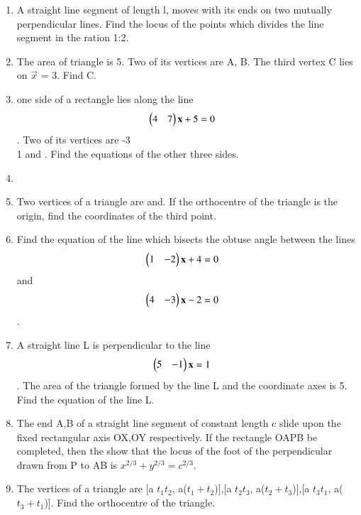 \begin{enumerate}
    \item  A straight line segment of length l, moves with its ends on two mutually perpendicular lines. Find the locus of the points which divides the line segment in the ration 1:2.
    \item The area of triangle is 5. Two of its vertices are A, B. The third vertex C lies on $\vec {x}$ = 3. Find C.
    \item one side of a rectangle lies along the line \begin{align}\begin{pmatrix}4 & 7\end{pmatrix} \mathbf {x} + 5 &= 0\end{align}. Two of its vertices are \myvec-{3\\1} and . Find the equations of the other three sides.
   \item \item  Two vertices of a triangle are  and. If  the orthocentre of the triangle is the origin, find the coordinates of the third point.
     \item  Find the equation of the line which bisects the obtuse angle between the lines \begin{align}\begin{pmatrix}1 & -2\end{pmatrix} \mathbf {x} + 4 &= 0\end{align} and \begin{align}\begin{pmatrix}4 & -3\end{pmatrix} \mathbf {x} -2 &= 0\end{align}.
    \item A straight line L is perpendicular to the line \begin{align}\begin{pmatrix}5 & -1\end{pmatrix} \mathbf {x} &= 1\end{align}. The area of the triangle formed by the line L and the coordinate axes is 5. Find the equation of the line L.
    \item The end A,B of a straight line segment of constant length c slide upon the fixed rectangular axis OX,OY respectively. If the rectangle OAPB be completed, then the show that the locus of the foot of the perpendicular drawn from P to AB is $x^{2/3}+y^{2/3}=c^{2/3}$.
    \item The vertices of a triangle are [a $t_1t_2$, a($t_1+t_2$)],[a $t_2t_3$, a($t_2+t_3$)],[a $t_3t_1$, a($t_3+t_1$)]. Find the orthocentre of the triangle.

\end{enumerate}

